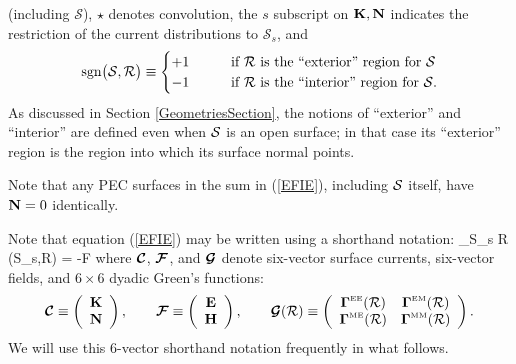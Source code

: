 (including $\mathcal S$), $\star$ denotes convolution,
the $s$ subscript on $\mathbf{K},\mathbf{N}$ indicates the restriction
of the current distributions to $\mathcal {S}_s$, and 
$$\text{sgn}\big(\mathcal{S},\mathcal{R}\big)\equiv
   \begin{cases} 
   +1  \qquad &\text{if $\mathcal{R}$ is the ``exterior'' 
                     region for $\mathcal{S}$}
   \\
   -1  \qquad &\text{if $\mathcal{R}$ is the ``interior'' 
                     region for $\mathcal{S}$.}
   \end{cases}
$$
As discussed in Section \ref{GeometriesSection},
the notions of ``exterior'' and ``interior'' are
defined even when $\mathcal{S}$ is an open surface; in
that case its ``exterior'' region is the region
into which its surface normal points.

Note that any PEC surfaces in the sum in (\ref{EFIE}), 
including $\mathcal{S}$ itself, have $\mathbf{N}=0$ identically.

Note that equation (\ref{EFIE}) may be written using
a shorthand notation:
{  \sum_{\mc S_s \subset \partial \mc R}
   \big(\mc S_s,\mc R\big)
    = 
    -\bmc F\incr
}
where $\boldsymbol{\mathcal{C}}$, $\boldsymbol{\mathcal{F}}$, and $\boldsymbol{\mathcal{G}}$ denote
six-vector surface currents, six-vector fields, and
$6\times 6$ dyadic Green's functions:
$$ \boldsymbol{\mathcal{C}} 
   \equiv
   \left(\begin{array}{c} \mathbf{K} \\ \mathbf{N} \end{array}\right),
   \qquad
   \boldsymbol{\mathcal{F}}
   \equiv
   \left(\begin{array}{c} \mathbf{E} \\ \mathbf{H} \end{array}\right), 
   \qquad
   \boldsymbol{\mathcal{G}}(\mathcal{R})\equiv
   \left(\begin{array}{cc}
   \boldsymbol{\Gamma}^{\hbox{\tiny{EE}}}(\mathcal{R}) & \boldsymbol{\Gamma}^{\hbox{\tiny{EM}}}(\mathcal{R})  \\
   \boldsymbol{\Gamma}^{\hbox{\tiny{ME}}}(\mathcal{R}) & \boldsymbol{\Gamma}^{\hbox{\tiny{MM}}}(\mathcal{R})  \\
   \end{array}\right).
$$
We will use this 6-vector shorthand notation frequently
in what follows.

